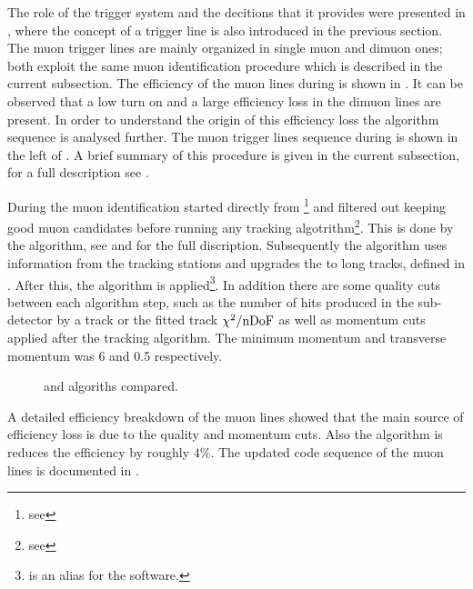The role of the trigger system and the decitions that it provides were presented in ,
where the concept of a trigger line is also introduced in the previous section. The \hltone muon trigger lines are
mainly organized in single muon and dimuon ones; both exploit the same muon identification procedure which
is described in the current subsection. The efficiency of the muon lines during \runone is shown in .
It can be observed that a low \pt turn on and a large efficiency loss in the dimuon lines are present.
In order to understand the origin of this efficiency loss the \hltone algorithm sequence is analysed further.
The \hltone muon trigger lines sequence during \runone is shown in the left of .
A brief summary of this procedure is given in the current subsection, for a full description see \cite{LHCb-PUB-2011-017}.

During \runone the muon identification started directly from \veloTracks\footnote{see }
and filtered out keeping good muon candidates before running any tracking algotrithm\footnote{see }.
This is done by the \mvm algorithm, see  and \cite{LHCb-PUB-2011-017} for the full discription.
Subsequently the \FwD algorithm uses information from the tracking stations and upgrades the \veloTracks to long tracks, defined in .
After this, the \isMuon algorithm is applied\footnote{\isMuon is an alias for the \muonID software.}.
In addition there are some quality cuts between each algorithm step, such as the number of hits produced in the
\velo sub-detector by a track or the fitted track $\chi^2/{\rm nDoF}$ as well as momentum cuts applied after the \FwD
tracking algorithm. The minimum momentum and transverse momentum was 6 \gevc and 0.5 \gevc respectively.

\begin{figure}[t]
  \centering
  \scalebox{1}{}
  \scalebox{1}{}
 \caption{ \runone and \runtwo \hltone algoriths compared. }
  \label{hlt1_algo_seq}
\end{figure}

A detailed efficiency breakdown \cite{kevinThesis} of the \runone \hltone muon lines showed that the main source of efficiency
loss is due to the quality and momentum cuts. Also the \mvm algorithm is reduces the efficiency by roughly $4\%$.
The updated code sequence of the \hltone muon lines is documented in \cite{kevinThesis}.

